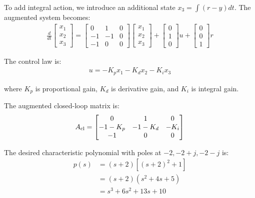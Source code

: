 \documentclass[11pt,a4paper]{article}
\begin{document}
To add integral action, we introduce an additional state $x_3 = \int (r - y) dt$. The augmented system becomes:
\begin{align}
  \frac{d}{dt}\begin{bmatrix} x_1 \\ x_2 \\ x_3 \end{bmatrix} = \begin{bmatrix} 0 & 1 & 0 \\ -1 & -1 & 0 \\ -1 & 0 & 0 \end{bmatrix}\begin{bmatrix} x_1 \\ x_2 \\ x_3 \end{bmatrix} + \begin{bmatrix} 0 \\ 1 \\ 0 \end{bmatrix}u + \begin{bmatrix} 0 \\ 0 \\ 1 \end{bmatrix}r
\end{align}

The control law is:
\begin{align}
  u = -K_p x_1 - K_d x_2 - K_i x_3
\end{align}

where $K_p$ is proportional gain, $K_d$ is derivative gain, and $K_i$ is integral gain.

The augmented closed-loop matrix is:
\begin{align}
  A_{\text{cl}} = \begin{bmatrix} 0 & 1 & 0 \\ -1-K_p & -1-K_d & -K_i \\ -1 & 0 & 0 \end{bmatrix}
\end{align}

The desired characteristic polynomial with poles at $-2, -2+j, -2-j$ is:
\begin{align}
  p(s) &= (s+2)\left[(s+2)^2 + 1\right] \\
  &= (s+2)(s^2 + 4s + 5) \\
  &= s^3 + 6s^2 + 13s + 10
\end{align}
\end{document}
